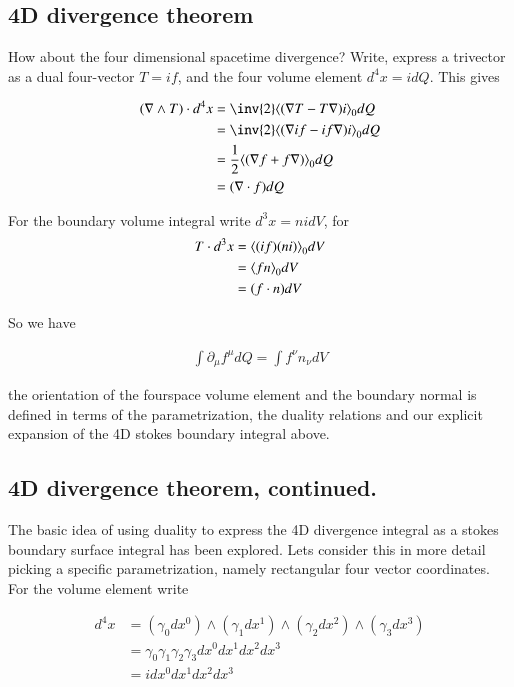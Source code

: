 \subsection{4D divergence theorem}

How about the four dimensional spacetime divergence?  Write, express a trivector as a dual four-vector $T = if$, and the four volume element $d^4 x = i dQ$.  This gives

\begin{align*}
(\grad \wedge T) \cdot d^4 x
&=
\inv{2} \gpgradezero{ (\grad T - T \grad) i } dQ \\
&=
\inv{2} \gpgradezero{ (\grad i f - if \grad) i } dQ \\
&=
\frac{1}{2} \gpgradezero{ (\grad f + f \grad) } dQ \\
&=
(\grad \cdot f) dQ
\end{align*}

For the boundary volume integral write $d^3 x = n i dV$, for
\begin{align*}
T \cdot d^3 x 
&= 
{\left\langle{{ (if) ( n i ) }}\right\rangle}_{0} dV \\
&= 
{\left\langle{{ f n }}\right\rangle}_{0} dV \\
&= 
(f \cdot n) dV
\end{align*}

So we have

\begin{align*}
\int \partial_\mu f^\mu dQ = \int f^\nu n_\nu dV
\end{align*}

the orientation of the fourspace volume element and the boundary normal is defined in terms of the parametrization, the duality relations and our explicit expansion of the 4D stokes boundary integral above.

\subsection{4D divergence theorem, continued.}

The basic idea of using duality to express the 4D divergence integral as a stokes boundary surface integral has been explored.  Lets consider this in more detail picking a specific parametrization, namely rectangular four vector coordinates.  For the volume element write

\begin{align*}
d^4 x 
&= ( \gamma_0 dx^0 ) \wedge ( \gamma_1 dx^1 ) \wedge ( \gamma_2 dx^2 ) \wedge ( \gamma_3 dx^3 ) \\
&= \gamma_0 \gamma_1 \gamma_2 \gamma_3 dx^0 dx^1 dx^2 dx^3 \\
&= i dx^0 dx^1 dx^2 dx^3 \\
\end{align*}

